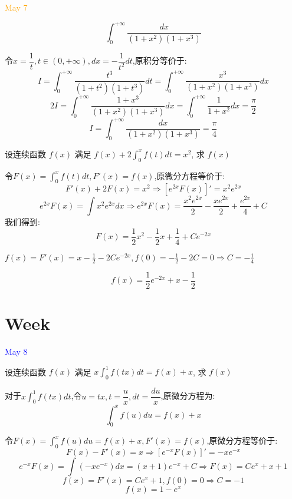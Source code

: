 \textcolor{orange}{May 7}

\begin{example}[][Exam: 31.1.13]
	$$\int_{0}^{+\infty}\dfrac{dx}{(1+x^2)(1+x^3)}$$
\end{example}

\begin{solution}
	
	令$x=\dfrac{1}{t},t\in(0,+\infty),dx=-\dfrac{1}{t^2}dt$,原积分等价于: 
	$$I=\int_{0}^{+\infty}\dfrac{t^3}{(1+t^2)(1+t^3)}dt=\int_{0}^{+\infty}\dfrac{x^3}{(1+x^2)(1+x^3)}dx$$
	$$2I=\int_{0}^{+\infty}\dfrac{1+x^3}{(1+x^2)(1+x^3)}dx=\int_{0}^{+\infty}\dfrac{1}{1+x^2}dx=\frac{\pi}{2}$$
	$$I=\int_{0}^{+\infty}\dfrac{dx}{(1+x^2)(1+x^3)}=\frac{\pi}{4}$$
\end{solution}

\begin{example}[][Exam: 31.1.14]
	设连续函数 $f(x)$ 满足 $f(x)+2\int_{0}^{x}f(t)dt=x^2$, 求 $f(x)$
\end{example}

\begin{solution}
	
	令$F(x)=\int_{0}^{x}f(t)dt,F'(x)=f(x)$,原微分方程等价于: 
	$$F'(x)+2F(x)=x^2\Rightarrow [e^{2x}F(x)]'=x^2e^{2x}$$
	$$e^{2x}F(x)=\int x^2e^{2x}dx\Rightarrow e^{2x}F(x)=\frac{x^2e^{2x}}{2}-\frac{xe^{2x}}{2}+\frac{e^{2x}}{4}+C$$
	我们得到: $$F(x)=\frac{1}{2}x^2-\frac{1}{2}x+\frac{1}{4}+Ce^{-2x}$$
	
	$f(x)=F'(x)=x-\frac{1}{2}-2Ce^{-2x},f(0)=-\frac{1}{2}-2C=0\Rightarrow C=-\frac{1}{4}$
	
	$$f(x)=\frac{1}{2}e^{-2x}+x-\frac{1}{2}$$
	
\end{solution}

\section{Week }
\textcolor{blue}{May 8}

\begin{example}[][Exam: 31.2.1]
	设连续函数 $f(x)$ 满足 $x\int_{0}^{1}f(tx)dt = f(x)+x$, 求 $f(x)$
\end{example}

\begin{solution}
	
	对于$x\int_{0}^{1}f(tx)dt$,令$u=tx,t=\dfrac{u}{x},dt=\dfrac{du}{x}$,原微分方程为: 
	$$\int_{0}^{x}f(u)du=f(x)+x$$
	
	令$F(x)=\int_{0}^{x}f(u)du=f(x)+x,F'(x)=f(x)$,原微分方程等价于: 
	$$F(x)-F'(x)=x\Rightarrow [e^{-x}F(x)]'=-xe^{-x}$$
	$$e^{-x}F(x)=\int(-xe^{-x})dx=(x+1)e^{-x}+C\Rightarrow F(x)=Ce^{x}+x+1$$
	$$f(x)=F'(x)=Ce^{x}+1,f(0)=0\Rightarrow C=-1$$
	$$f(x)=1-e^{x}$$
\end{solution}

